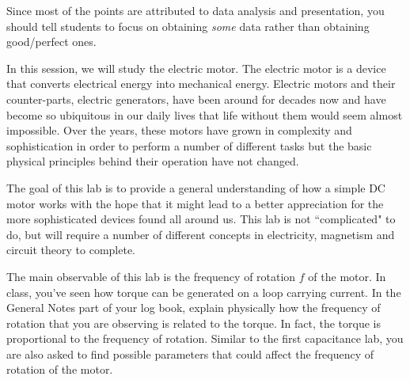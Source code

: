 \documentclass[12pt]{report}
\begin{document}
\begin{tcolorbox}[title=Important Announcement]
Since most of the points are attributed to data analysis and presentation, you should tell students to focus on obtaining \textit{some} data rather than obtaining good/perfect ones.
\end{tcolorbox}

In this session, we will study the electric motor. The electric motor is a device that converts electrical energy into mechanical energy. Electric motors and their counter-parts, electric generators, have been around for decades now and have become so ubiquitous in our daily lives that life without them would seem almost impossible. Over the years, these motors have grown in complexity and sophistication in order to perform a number of different tasks but the basic physical principles behind their operation have not changed.

The goal of this lab is to provide a general understanding of how a simple DC motor works with the hope that it might lead to a better appreciation for the more sophisticated devices found all around us. This lab is not ``complicated" to do, but will require a number of different concepts in electricity, magnetism and circuit theory to complete.

The main observable of this lab is the frequency of rotation $f$ of the motor.
In class, you've seen how torque can be generated on a loop carrying current. {\color{blue} In the General Notes part of your log book, explain physically how the frequency of rotation that you are observing is related to the torque.} In fact, the torque is proportional to the frequency of rotation.
Similar to the first capacitance lab, you are also asked to find possible parameters that could affect the frequency of rotation of the motor.
\end{document}
